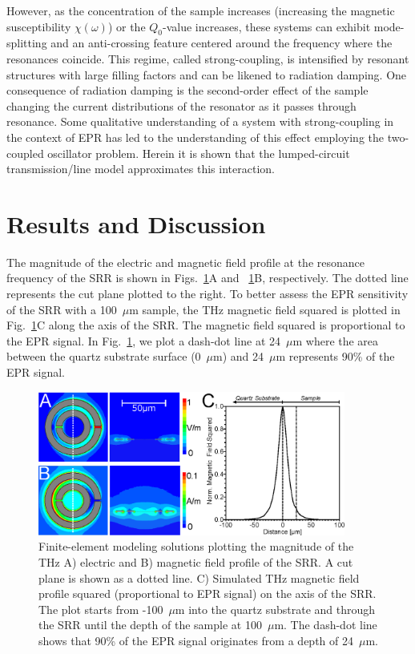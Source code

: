However, as the concentration of the sample increases (increasing the magnetic susceptibility $\chi(\omega)$) or the $Q_0$-value increases, these systems can exhibit mode-splitting and an anti-crossing feature centered around the frequency where the resonances coincide. This regime, called strong-coupling, is intensified by resonant structures with large filling factors and can be likened to radiation damping. \cite{BloembergenRadDamp, BloomRadDamp, MeiboomRadDamp} One consequence of radiation damping is the second-order effect of the sample changing the current distributions of the resonator as it passes through resonance. Some qualitative understanding of a system with strong-coupling in the context of EPR has led to the understanding of this effect employing the two-coupled oscillator problem. \cite{SchneiderEPR,BOERO2013133} Herein it is shown that the lumped-circuit transmission\-/line model approximates this interaction. 

\section{Results and Discussion}
The magnitude of the electric and magnetic field profile at the resonance frequency of the SRR is shown in Figs.~\ref{ch3-fig:HFSS}A and ~\ref{ch3-fig:HFSS}B, respectively. The dotted line represents the cut plane plotted to the right. To better assess the EPR sensitivity of the SRR with a 100~$\mu$m sample, the THz magnetic field squared is plotted in Fig.~\ref{ch3-fig:HFSS}C along the axis of the SRR. The magnetic field squared is proportional to the EPR signal. In Fig.~\ref{ch3-fig:HFSS}, we plot a dash-dot line at 24~$\mu$m where the area between the quartz substrate surface (0~$\mu$m) and 24~$\mu$m represents 90\% of the EPR signal.

\begin{figure}[htp]
\centering
  \includegraphics[width=0.9\textwidth]{Kapitel/Ch3-Images/02-AnsoftFields.eps}%
  \caption[Finite-element simulation solutions of SRR geometry.]{Finite-element modeling solutions plotting the magnitude of the THz A) electric and B) magnetic field profile of the SRR. A cut plane is shown as a dotted line. C) Simulated THz magnetic field profile squared (proportional to EPR signal) on the axis of the SRR. The plot starts from -100~$\mu$m into the quartz substrate and through the SRR until the depth of the sample at 100~$\mu$m. The dash-dot line shows that 90\% of the EPR signal originates from a depth of 24~$\mu$m.}
  \label{ch3-fig:HFSS}
\end{figure}

